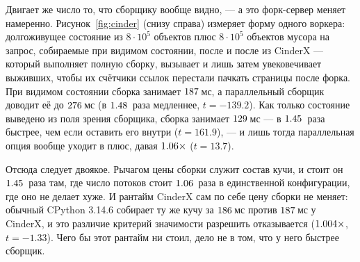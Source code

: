 Двигает же число то, что сборщику вообще видно, --- а это форк-сервер меняет намеренно.
Рисунок~\ref{fig:cinder} (снизу справа) измеряет форму одного воркера: долгоживущее состояние из
$8\cdot10^5$ объектов плюс $8\cdot10^5$ объектов мусора на запрос, собираемые при видимом
состоянии, после  и после  из CinderX --- который
выполняет полную сборку, вызывает  и лишь затем увековечивает выживших, чтобы их
счётчики ссылок перестали пачкать страницы после форка. При видимом состоянии сборка занимает
$\meas{med:b6_gcscale-fork_cinderx:gc_collect/fork_cinderx/state_visible_serial:ms}{187}$\,мс, а параллельный сборщик доводит её до $\meas{med:b6_gcscale-fork_cinderx:gc_collect/fork_cinderx/state_visible_par6:ms}{276}$\,мс (в $\meas{ratio:b6_gcscale-fork_cinderx:gc_collect/fork_cinderx/state_visible_par6|b6_gcscale-fork_cinderx:gc_collect/fork_cinderx/state_visible_serial}{1.48}$~раза медленнее, $t=-139.2$).
Как только состояние выведено из поля зрения сборщика, сборка занимает $\meas{med:b6_gcscale-fork_cinderx:gc_collect/fork_cinderx/immortal_serial:ms}{129}$\,мс --- в
$\meas{ratio:b6_gcscale-fork_cinderx:gc_collect/fork_cinderx/state_visible_serial|b6_gcscale-fork_cinderx:gc_collect/fork_cinderx/immortal_serial}{1.45}$~раза быстрее, чем если оставить его внутри ($t=161.9$), --- и лишь тогда параллельная
опция вообще уходит в плюс, давая $\meas{ratio:b6_gcscale-fork_cinderx:gc_collect/fork_cinderx/immortal_serial|b6_gcscale-fork_cinderx:gc_collect/fork_cinderx/immortal_par6}{1.06}\times$ ($t=13.7$).

Отсюда следует двоякое. Рычагом цены сборки служит состав кучи, и стоит он $\meas{ratio:b6_gcscale-fork_cinderx:gc_collect/fork_cinderx/state_visible_serial|b6_gcscale-fork_cinderx:gc_collect/fork_cinderx/immortal_serial}{1.45}$~раза там, где
число потоков стоит $\meas{ratio:b6_gcscale-fork_cinderx:gc_collect/fork_cinderx/immortal_serial|b6_gcscale-fork_cinderx:gc_collect/fork_cinderx/immortal_par6}{1.06}$~раза в единственной конфигурации, где оно не делает хуже. И рантайм
CinderX сам по себе цену сборки не меняет: обычный CPython 3.14.6 собирает ту же кучу за
$\meas{med:b6_gcscale-stock:gc_collect/stock/state_visible_serial:ms}{186}$\,мс против $\meas{med:b6_gcscale-fork_cinderx:gc_collect/fork_cinderx/state_visible_serial:ms}{187}$\,мс у CinderX, и это различие критерий значимости разрешить отказывается
($\meas{ratio:b6_gcscale-fork_cinderx:gc_collect/fork_cinderx/state_visible_serial|b6_gcscale-stock:gc_collect/stock/state_visible_serial}{1.004}\times$, $t=-1.33$). Чего бы этот рантайм ни стоил, дело не в том, что у него быстрее
сборщик.

